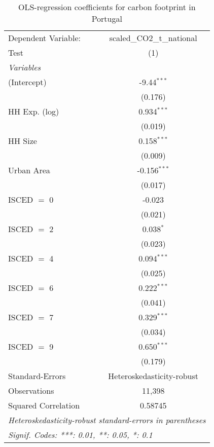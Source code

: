 
\begin{table}[htbp!]
   \centering
   \small
   \begin{adjustbox}{width = 1\textwidth, max height = 0.95\textheight, center}
      \begin{threeparttable}[b]
         \caption{\label{tab:OLS_2_PRT} OLS-regression coefficients for carbon footprint in Portugal}
         \begin{tabular}{lc}
            \tabularnewline \midrule \midrule
            Dependent Variable: & scaled\_CO2\_t\_national\\     
            Test                & (1)\\  
            \midrule
            \emph{Variables}\\
            (Intercept)         & -9.44$^{***}$\\   
                                & (0.176)\\   
            HH Exp. (log)       & 0.934$^{***}$\\   
                                & (0.019)\\   
            HH Size             & 0.158$^{***}$\\   
                                & (0.009)\\   
            Urban Area          & -0.156$^{***}$\\   
                                & (0.017)\\   
            ISCED $=$ 0         & -0.023\\   
                                & (0.021)\\   
            ISCED $=$ 2         & 0.038$^{*}$\\   
                                & (0.023)\\   
            ISCED $=$ 4         & 0.094$^{***}$\\   
                                & (0.025)\\   
            ISCED $=$ 6         & 0.222$^{***}$\\   
                                & (0.041)\\   
            ISCED $=$ 7         & 0.329$^{***}$\\   
                                & (0.034)\\   
            ISCED $=$ 9         & 0.650$^{***}$\\   
                                & (0.179)\\   
            \midrule 
            Standard-Errors     & Heteroskedasticity-robust \\   
            Observations        & 11,398\\  
            Squared Correlation & 0.58745\\  
            \midrule \midrule
            \multicolumn{2}{l}{\emph{Heteroskedasticity-robust standard-errors in parentheses}}\\
            \multicolumn{2}{l}{\emph{Signif. Codes: ***: 0.01, **: 0.05, *: 0.1}}\\
         \end{tabular}
         

\end{threeparttable}
\end{adjustbox}
\end{table}
